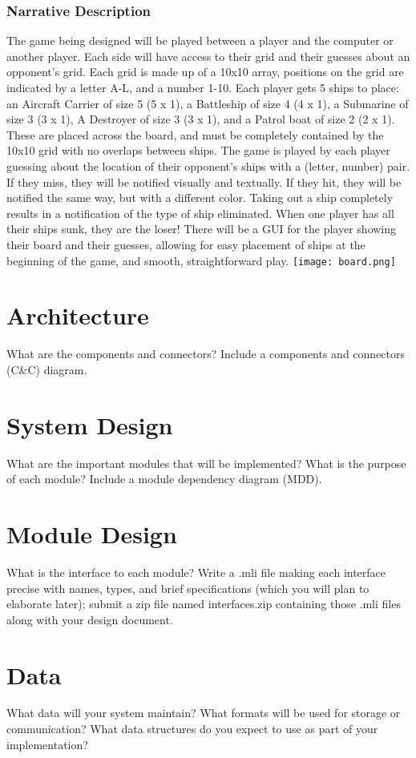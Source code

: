 \documentclass[10pt]{article}
\begin{document}
\section*{Narrative Description}
The game being designed will be played between a player and the computer or another player.
Each side will have access to their grid and their guesses about an opponent’s grid.
Each grid is made up of a 10x10 array, positions on the grid are indicated by a letter A-L, and a number 1-10.
Each player gets 5 ships to place: an Aircraft Carrier of size 5 (5 x 1), a Battleship of size 4 (4 x 1), a Submarine of size 3 (3 x 1), A Destroyer of size 3 (3 x 1), and a Patrol boat of size 2 (2 x 1).
These are placed across the board, and must be completely contained by the 10x10 grid with no overlaps between ships.
The game is played by each player guessing about the location of their opponent’s ships with a (letter, number) pair.
If they miss, they will be notified visually and textually.
If they hit, they will be notified the same way, but with a different color.
Taking out a ship completely results in a notification of the type of ship eliminated.
When one player has all their ships sunk, they are the loser!
There will be a GUI for the player showing their board and their guesses, allowing for easy placement of ships at the beginning of the game, and smooth, straightforward play.
\texttt{[image: board.png]}

\part*{Architecture}
What are the components and connectors? Include a components and connectors (C&C) diagram.
\part*{System Design}
What are the important modules that will be implemented? What is the purpose of each module? Include a module dependency diagram (MDD).
\part*{Module Design}
What is the interface to each module? Write a .mli file making each interface precise with names, types, and brief specifications (which you will plan to elaborate later); submit a zip file named interfaces.zip containing those .mli files along with your design document.
\part*{Data}
What data will your system maintain? What formats will be used for storage or communication? What data structures do you expect to use as part of your implementation?
\end{document}
